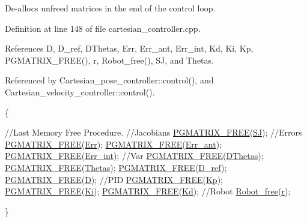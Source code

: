De-\/allocs unfreed matrices in the end of the control loop. 



Definition at line 148 of file cartesian\-\_\-controller.\-cpp.



References D, D\-\_\-ref, D\-Thetas, Err, Err\-\_\-ant, Err\-\_\-int, Kd, Ki, Kp, P\-G\-M\-A\-T\-R\-I\-X\-\_\-\-F\-R\-E\-E(), r, Robot\-\_\-free(), S\-J, and Thetas.



Referenced by Cartesian\-\_\-pose\-\_\-controller\-::control(), and Cartesian\-\_\-velocity\-\_\-controller\-::control().


\begin{DoxyCode}
                                         \{

        \textcolor{comment}{//Last Memory Free Procedure.}
        \textcolor{comment}{//Jacobians}
        \hyperlink{gmatrix_8h_a9a73b4e0a77f386c0bae1bba75298d1d}{PGMATRIX\_FREE}(\hyperlink{classCartesian__controller_a98fdac06d136ac3dba0102d97cd5dd36}{SJ});
        \textcolor{comment}{//Errors}
        \hyperlink{gmatrix_8h_a9a73b4e0a77f386c0bae1bba75298d1d}{PGMATRIX\_FREE}(\hyperlink{classCartesian__controller_ab3f08ecf10cb2486e8bfc61f07e2bde6}{Err});
        \hyperlink{gmatrix_8h_a9a73b4e0a77f386c0bae1bba75298d1d}{PGMATRIX\_FREE}(\hyperlink{classCartesian__controller_a6d9471a983f6cb6c642bf8dea0d540af}{Err\_ant});
        \hyperlink{gmatrix_8h_a9a73b4e0a77f386c0bae1bba75298d1d}{PGMATRIX\_FREE}(\hyperlink{classCartesian__controller_a248174c6399a8933bfcc8f1b0b39af5e}{Err\_int});
        \textcolor{comment}{//Var}
        \hyperlink{gmatrix_8h_a9a73b4e0a77f386c0bae1bba75298d1d}{PGMATRIX\_FREE}(\hyperlink{classCartesian__controller_a5d6419e62e130150edfcbd82b1dadcae}{DThetas});
        \hyperlink{gmatrix_8h_a9a73b4e0a77f386c0bae1bba75298d1d}{PGMATRIX\_FREE}(\hyperlink{classCartesian__controller_a0a0f818dad601cd9e3e26cb6959b8eb6}{Thetas});
        \hyperlink{gmatrix_8h_a9a73b4e0a77f386c0bae1bba75298d1d}{PGMATRIX\_FREE}(\hyperlink{classCartesian__controller_abb248cb3215a574fe8e1bb8fb0b8626d}{D\_ref});
        \hyperlink{gmatrix_8h_a9a73b4e0a77f386c0bae1bba75298d1d}{PGMATRIX\_FREE}(\hyperlink{classCartesian__controller_a8c470b652ce436d8e48f126073fc2593}{D});
        \textcolor{comment}{//PID}
        \hyperlink{gmatrix_8h_a9a73b4e0a77f386c0bae1bba75298d1d}{PGMATRIX\_FREE}(\hyperlink{classCartesian__controller_a78073f51064a05d72c41723a93d9079f}{Kp});
        \hyperlink{gmatrix_8h_a9a73b4e0a77f386c0bae1bba75298d1d}{PGMATRIX\_FREE}(\hyperlink{classCartesian__controller_a70e495f39da706f1b589684f58343b9e}{Ki});
        \hyperlink{gmatrix_8h_a9a73b4e0a77f386c0bae1bba75298d1d}{PGMATRIX\_FREE}(\hyperlink{classCartesian__controller_a62394cef8a9a29eac18319a4ad579c4c}{Kd});
        \textcolor{comment}{//Robot}
        \hyperlink{robot_8h_a31f8aee15b6c24f89ab51b1bc1341f33}{Robot\_free}(\hyperlink{classCartesian__controller_a5562129951bd802e4ded77fc716c87a0}{r});

\}
\end{DoxyCode}


